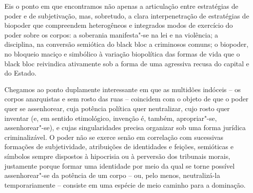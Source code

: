 Eis o ponto em que encontramos não apenas a articulação entre
estratégias de poder e de subjetivação, mas, sobretudo, a clara
interpenetração de estratégias de biopoder que compreendem heterogêneos
e integrados modos de exercício do poder sobre os corpos: a soberania
manifesta"-se na lei e na violência; a disciplina, na conversão semiótica
do black bloc a criminosos comuns; o biopoder, no bloqueio maciço e
simbólico à variação biopolítica das formas de vida que o black bloc
reivindica ativamente sob a forma de uma agressiva recusa do capital e
do Estado.

Chegamos ao ponto duplamente interessante em que as multidões indóceis
-- os corpos anarquistas e sem rosto das ruas -- coincidem com o objeto
de que o poder quer se assenhorear, cuja potência política quer
neutralizar, cujo rosto quer inventar (e, em sentido etimológico,
invenção é, também, apropriar"-se, assenhorear"-se), e cujas
singularidades precisa organizar sob uma forma jurídica criminalizável.
O poder não se exerce senão em correlação com sucessivas formações de
subjetividade, atribuições de identidades e feições, semióticas e
símbolos sempre dispostos à hipocrisia ou à perversão dos tribunais
morais, justamente porque formar uma identidade por meio da qual se
torne possível assenhorear"-se da potência de um corpo -- ou, pelo menos,
neutralizá-la temporariamente -- consiste em uma espécie de meio caminho
para a dominação.

